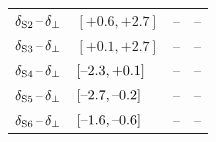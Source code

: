 \begin{table}[htbp]
\begin{tabular}{lllcc}
    $\delSperp[2]$  &   \multicolumn{2}{l}{%
                                           $[\text{+0.6},   \text{+2.7}]$}    &  --  &  --  \\
    $\delSperp[3]$  &   \multicolumn{2}{l}{%
                                           $[\text{+0.1},   \text{+2.7}]$}    &  --  &  --  \\
    $\delSperp[4]$  &   \multicolumn{2}{l}{%
                                           $[\text{\tm2.3}, \text{+0.1}]$}    &  --  &  --  \\
    $\delSperp[5]$  &   \multicolumn{2}{l}{%
                                           $[\text{\tm2.7}, \text{\tm0.2}]$}  &  --  &  --  \\
    $\delSperp[6]$  &   \multicolumn{2}{l}{%
                                           $[\text{\tm1.6}, \text{\tm0.6}]$}  &  --  &  --  \\
    \hline
  \end{tabular}
\end{table}

